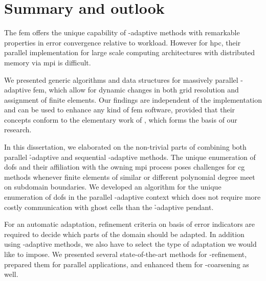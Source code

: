 \chapter{Summary and outlook}
\label{ch:summary}
\glsresetall


The \gls{fem} offers the unique capability of \hp-adaptive methods with remarkable properties in error convergence relative to workload. However for \gls{hpc}, their parallel implementation for large scale computing architectures with distributed memory via \gls{mpi} is difficult.

We presented generic algorithms and data structures for massively parallel \hp-adaptive \gls{fem}, which allow for dynamic changes in both grid resolution and assignment of finite elements. Our findings are independent of the implementation and can be used to enhance any kind of \gls{fem} software, provided that their concepts conform to the elementary work of \textcite{bangerth2009,bangerth2012}, which forms the basis of our research.




In this dissertation, we elaborated on the non-trivial parts of combining both parallel \h-adaptive and sequential \hp-adaptive methods.
The unique enumeration of \glspl{dof} and their affiliation with the owning \gls{mpi} process poses challenges for \gls{cg} methods whenever finite elements of similar or different polynomial degree meet on subdomain boundaries. We developed an algorithm for the unique enumeration of \glspl{dof} in the parallel \hp-adaptive context which does not require more costly communication with ghost cells than the \h-adaptive pendant.

For an automatic adaptation, refinement criteria on basis of error indicators are required to decide which parts of the domain should be adapted. In addition using \hp-adaptive methods, we also have to select the type of adaptation we would like to impose.
We presented several state-of-the-art methods for \hp-refinement, prepared them for parallel applications, and enhanced them for \hp-coarsening as well.


